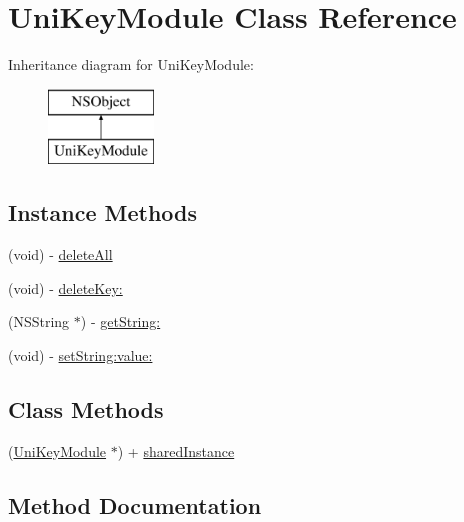 \hypertarget{interface_uni_key_module}{}\section{Uni\+Key\+Module Class Reference}
\label{interface_uni_key_module}
Inheritance diagram for Uni\+Key\+Module\+:\begin{figure}[H]
\begin{center}
\leavevmode
\includegraphics[height=2.000000cm]{interface_uni_key_module}
\end{center}
\end{figure}
\subsection*{Instance Methods}
\begin{DoxyCompactItemize}
\item 
(void) -\/ \mbox{\hyperlink{interface_uni_key_module_ae37bf10e6cf96ec636dcfbf5bdd8fa21}{delete\+All}}
\item 
(void) -\/ \mbox{\hyperlink{interface_uni_key_module_aa09e63616e9bf53c82d9ab230fe111b4}{delete\+Key\+:}}
\item 
(N\+S\+String $\ast$) -\/ \mbox{\hyperlink{interface_uni_key_module_ad14f35dbf0453ec2807028edc3bc5c7f}{get\+String\+:}}
\item 
(void) -\/ \mbox{\hyperlink{interface_uni_key_module_a7240067e8b706485080753c8a8a063c1}{set\+String\+:value\+:}}
\end{DoxyCompactItemize}
\subsection*{Class Methods}
\begin{DoxyCompactItemize}
\item 
(\mbox{\hyperlink{interface_uni_key_module}{Uni\+Key\+Module}} $\ast$) + \mbox{\hyperlink{interface_uni_key_module_a32a8491c21919320c2b88f1252aad3c9}{shared\+Instance}}
\end{DoxyCompactItemize}


\subsection{Method Documentation}
\mbox{\label{interface_uni_key_module_ae37bf10e6cf96ec636dcfbf5bdd8fa21}} 
